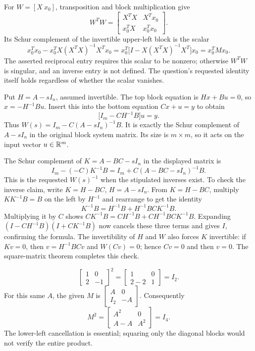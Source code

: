 For $W=[X\ x_0]$, transposition and block multiplication give
\[W^TW=\begin{bmatrix}X^TX&X^Tx_0\\x_0^TX&x_0^Tx_0\end{bmatrix}.\]
Its Schur complement of the invertible upper-left block is the scalar
\[x_0^Tx_0-x_0^TX(X^TX)^{-1}X^Tx_0
=x_0^T\bigl[I-X(X^TX)^{-1}X^T\bigr]x_0=x_0^TMx_0.\]
The asserted reciprocal entry requires this scalar to be nonzero;
otherwise $W^TW$ is singular, and an inverse entry is not defined.
The question's requested identity itself holds regardless of whether
the scalar vanishes.

Put $H=A-sI_n$, assumed invertible. The top block equation is
$Hx+Bu=0$, so $x=-H^{-1}Bu$. Insert this into the bottom equation
$Cx+u=y$ to obtain
\[\bigl[I_m-CH^{-1}B\bigr]u=y.\]
Thus $W(s)=I_m-C(A-sI_n)^{-1}B$.
It is exactly the Schur complement of $A-sI_n$ in the original
block system matrix. Its size is $m\times m$, so it acts on the
input vector $u\in\mathbb{R}^m$.

The Schur complement of $K=A-BC-sI_n$ in the displayed matrix is
\[I_m-(-C)K^{-1}B=I_m+C(A-BC-sI_n)^{-1}B.\]
This is the requested $W(s)^{-1}$ when the stipulated inverses exist.
To check the inverse claim, write $K=H-BC$, $H=A-sI_n$.
From $K=H-BC$, multiply $K K^{-1}B=B$ on the left by
$H^{-1}$ and rearrange to get the identity
\[K^{-1}B=H^{-1}B+H^{-1}BC K^{-1}B.\]
Multiplying it by $C$ shows
$CK^{-1}B=CH^{-1}B+CH^{-1}BC K^{-1}B$.
Expanding $(I-CH^{-1}B)(I+CK^{-1}B)$ now cancels these three
terms and gives $I$, confirming the formula.
The invertibility of $H$ and $W$ also forces $K$ invertible:
if $Kv=0$, then $v=H^{-1}BCv$ and $W(Cv)=0$; hence $Cv=0$
and then $v=0$. The square-matrix theorem completes this check.

\[\begin{bmatrix}1&0\\2&-1\end{bmatrix}^2
=\begin{bmatrix}1&0\\2-2&1\end{bmatrix}=I_2.\]
For this same $A$, the given $M$ is
$\begin{bmatrix}A&0\\I_2&-A\end{bmatrix}$. Consequently
\[M^2=\begin{bmatrix}A^2&0\\A-A&A^2\end{bmatrix}=I_4.\]
The lower-left cancellation is essential; squaring only the diagonal
blocks would not verify the entire product.

